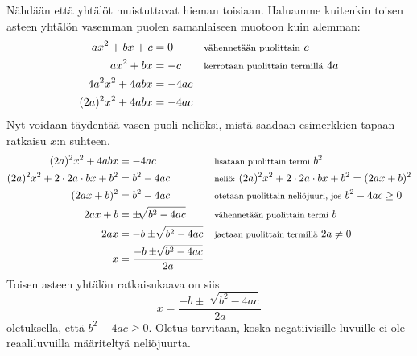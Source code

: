Nähdään että yhtälöt muistuttavat hieman toisiaan. Haluamme kuitenkin toisen asteen yhtälön vasemman puolen samanlaiseen muotoon kuin alemman:
\begin{align*}
ax^2+bx+c&=0 &&\textnormal{\footnotesize{vähennetään puolittain}} \ c \\
ax^2+bx &= -c &&\textnormal{\footnotesize{kerrotaan puolittain termillä}} \ 4a\\
4a^2 x^2 + 4abx &= -4ac \\
(2a)^2 x^2 +4abx &= -4ac 
\end{align*}
Nyt voidaan täydentää vasen puoli neliöksi, mistä saadaan esimerkkien tapaan ratkaisu $x$:n suhteen.
\begin{align*}
(2a)^2 x^2 +4abx &=-4ac &&\textnormal{\footnotesize{lisätään puolittain termi}} \ b^2 \\
(2a)^2 x^2 +2\cdot 2a\cdot bx +b^2&=b^2-4ac &&\textnormal{\footnotesize{neliö:}} \ (2a)^2 x^2 +2\cdot 2a\cdot bx+b^2=(2ax+b)^2 \\
(2ax+b)^2&=b^2-4ac &&\textnormal{\footnotesize{otetaan puolittain neliöjuuri, jos}} \ b^2 -4ac \geq 0 \\
2ax+b&= \pm \sqrt[]{b^2-4ac} &&\textnormal{\footnotesize{vähennetään puolittain termi}} \ b \\
2ax&=-b \pm \sqrt[]{b^2-4ac} &&\textnormal{\footnotesize{jaetaan puolittain termillä}} \ 2a \neq 0 \\
x&= \frac{-b \pm \sqrt[]{b^2-4ac}}{2a}
\end{align*}
Toisen asteen yhtälön ratkaisukaava on siis \[x= \frac{-b \pm \sqrt[]{b^2-4ac}}{2a}\] oletuksella, että $b^2-4ac \geq 0$. Oletus tarvitaan, koska negatiivisille luvuille ei ole reaaliluvuilla määriteltyä neliöjuurta.\\
